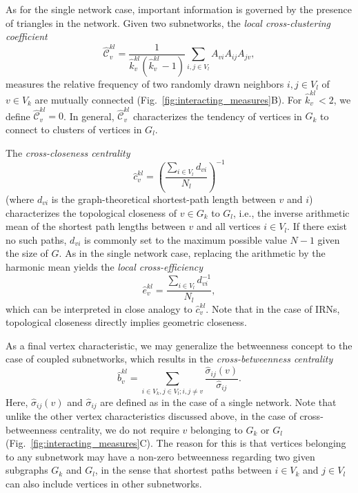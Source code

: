 		As for the single network case, important information is governed by the presence of triangles in the network. Given two subnetworks, the \textit{local cross-clustering coefficient}
\begin{equation}
\hat{\mathcal{C}}_v^{kl} = \frac{1}{\hat{k}_v^{kl}(\hat{k}_v^{kl} - 1)} \sum_{i,j \in V_l} A_{vi} A_{ij} A_{jv},
\label{eq:locclustering_cross}
\end{equation}
\noindent
measures the relative frequency of two randomly drawn neighbors $i,j\in V_l$ of $v\in V_k$ are mutually connected (Fig.~\ref{fig:interacting_measures}B). For $\hat{k}_v^{kl}<2$, we define $\hat{\mathcal{C}}_v^{kl}=0$. In general, $\hat{\mathcal{C}}_v^{kl}$ characterizes the tendency of vertices in $G_k$ to connect to clusters of vertices in $G_l$. 

		The \textit{cross-closeness centrality}
\begin{equation}
\hat{c}_v^{kl} = \left(\frac{\sum_{i \in V_l} d_{vi}}{N_l}\right)^{-1}
\label{eq:closeness_cross}
\end{equation}
\noindent
(where $d_{vi}$ is the graph-theoretical shortest-path length between $v$ and $i$) characterizes the topological closeness of $v\in G_k$ to $G_l$, i.e., the inverse arithmetic mean of the shortest path lengths between $v$ and all vertices $i\in V_l$. If there exist no such paths, $d_{vi}$ is commonly set to the maximum possible value $N-1$ given the size of $G$. As in the single network case, replacing the arithmetic by the harmonic mean yields the \textit{local cross-efficiency}
\begin{equation}
\hat{e}_v^{kl} = \frac{\sum_{i \in V_l} d_{vi}^{-1}}{N_l},
\label{eq:locefficiency_cross}
\end{equation}
\noindent
which can be interpreted in close analogy to $\hat{c}_v^{kl}$. Note that in the case of IRNs, topological closeness directly implies geometric closeness.

		As a final vertex characteristic, we may generalize the betweenness concept to the case of coupled subnetworks, which results in the \textit{cross-betweenness centrality}
\begin{equation}
\hat{b}_v^{kl} = \sum_{i\in V_k,j\in V_l;i,j\neq v} \frac{\hat{\sigma}_{ij}(v)}{\hat{\sigma}_{ij}}.
\label{eq:betweenness_cross}
\end{equation}
\noindent
Here, $\hat{\sigma}_{ij}(v)$ and $\hat{\sigma}_{ij}$ are defined as in the case of a single network. Note that unlike the other vertex characteristics discussed above, in the case of cross-betweenness centrality, we do not require $v$ belonging to $G_k$ or $G_l$  (Fig.~\ref{fig:interacting_measures}C). The reason for this is that vertices belonging to any subnetwork may have a non-zero betweenness regarding two given subgraphs $G_k$ and $G_l$, in the sense that shortest paths between $i\in V_k$ and $j\in V_l$ can also include vertices in other subnetworks. 



